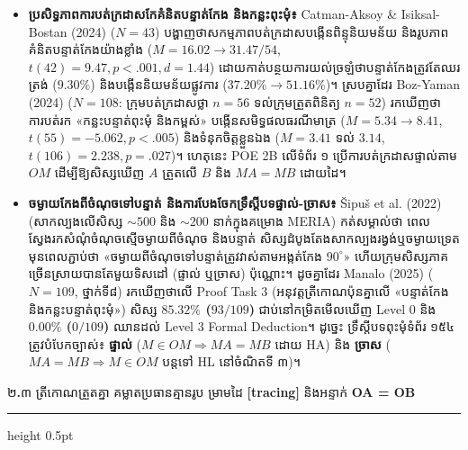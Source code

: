 \documentclass[a4paper,12pt]{article}
\newcommand{\en}[1]{{\TimesEn #1}}
\newcommand{\enbf}[1]{{\TimesEn\textbf{#1}}}
\newcommand{\subsectitle}[1]{{\muol\fontsize{11pt}{14.5pt}\selectfont #1}}
\newcommand{\subsec}[1]{%
  \needspace{1.6cm}%
  \vspace{4pt}%
  \subsectitle{#1}\par
  \vspace{2pt}\hrule height 0.5pt\vspace{3pt}%
}
\begin{document}
\begin{itemize}[leftmargin=0.50cm, topsep=2pt, itemsep=2.5pt, parsep=0pt]
  \item \textbf{ប្រសិទ្ធភាពការបត់ក្រដាសកែគំនិតបន្ទាត់កែង និងកន្លះពុះមុំ៖} \en{Catman-Aksoy \& Isiksal-Bostan (2024)} ($N=43$) បង្ហាញថាសកម្មភាពបត់ក្រដាសបង្កើនពិន្ទុនិយមន័យ និងរូបភាពគំនិតបន្ទាត់កែងយ៉ាងខ្លាំង ($M=16.02\to 31.47/54$, $t(42)=9.47, p<.001, d=1.44$) ដោយកាត់បន្ថយការយល់ច្រឡំថាបន្ទាត់កែងត្រូវតែឈរត្រង់ ($9.30\%$) និងបង្កើននិយមន័យផ្លូវការ ($37.20\%\to 51.16\%$)។ ស្របគ្នាដែរ \en{Boz-Yaman (2024)} ($N=108$: ក្រុមបត់ក្រដាសថ្លា $n=56$ ទល់ក្រុមត្រួតពិនិត្យ $n=52$) រកឃើញថាការបត់រក «កន្លះបន្ទាត់ពុះមុំ និងកម្ពស់» បង្កើនសមិទ្ធផលធរណីមាត្រ ($M=5.34\to 8.41$, $t(55)=-5.062, p<.005$) និងទំនុកចិត្តខ្លួនឯង ($M=3.41$ ទល់ $3.14$, $t(106)=2.238, p=.027$)។ ហេតុនេះ \en{POE 2B} លើទំព័រ ១ ប្រើការបត់ក្រដាសផ្ទាល់តាម $OM$ ដើម្បីឱ្យសិស្សឃើញ $A$ ត្រួតលើ $B$ និង $MA=MB$ ដោយដៃ។
  \item \textbf{ចម្ងាយកែងពីចំណុចទៅបន្ទាត់ និងការបែងចែកទ្រឹស្ដីបទផ្ទាល់-ច្រាស៖} \en{\v{S}ipu\v{s} et al. (2022)} (សាកល្បងលើសិស្ស $\sim 500$ និង $\sim 200$ នាក់ក្នុងគម្រោង \en{MERIA}) កត់សម្គាល់ថា ពេលស្វែងរកសំណុំចំណុចស្មើចម្ងាយពីចំណុច និងបន្ទាត់ សិស្សដំបូងតែងសាកល្បងរង្វង់ឬចម្ងាយទ្រេត មុនពេលភ្ជាប់ថា «ចម្ងាយពីចំណុចទៅបន្ទាត់ត្រូវវាស់តាមអង្កត់កែង $90^\circ$» ហើយក្រុមសិស្សភាគច្រើនស្រាយបានតែមួយទិសដៅ (ផ្ទាល់ ឬច្រាស) ប៉ុណ្ណោះ។ ដូចគ្នាដែរ \en{Manalo (2025)} ($N=109$, ថ្នាក់ទី៨) រកឃើញថាលើ \en{Proof Task 3} (អនុវត្តត្រីកោណប៉ុនគ្នាលើ «បន្ទាត់កែង និងកន្លះបន្ទាត់ពុះមុំ») សិស្ស \textbf{$85.32\%$ ($93/109$)} ជាប់នៅកម្រិតមើលឃើញ \en{Level 0} និង \textbf{$0.00\%$ ($0/109$)} ឈានដល់ \en{Level 3 Formal Deduction}។ ដូច្នេះ ទ្រឹស្ដីបទពុះមុំទំព័រ ១៥៤ ត្រូវបំបែកច្បាស់៖ \textbf{ផ្ទាល់} ($M\in OM\Rightarrow MA=MB$ ដោយ \en{HA}) និង \textbf{ច្រាស} ($MA=MB\Rightarrow M\in OM$ បន្តទៅ \en{HL} នៅចំណិតទី ៣)។
\end{itemize}

\subsec{២\enbf{.}៣ ត្រីកោណត្រួតគ្នា គម្លាតប្រធានគ្មានរូប ម្រាមដៃ \enbf{[tracing]} និងអន្ទាក់ \enbf{OA = OB}}
\end{document}
